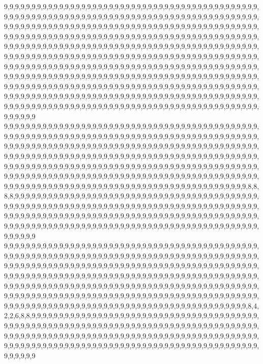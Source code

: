 9,9,9,9,9,9,9,9,9,9,9,9,9,9,9,9,9,9,9,9,9,9,9,9,9,9,9,9,9,9,9,9,9,9,9,9,9,9,9,9,9,9,9,9,9,9,9,9,9,9,9,9,9,9,9,9,9,9,9,9,9,9,9,9,9,9,9,9,9,9,9,9,9,9,9,9,9,9,9,9,9,9,9,9,9,9,9,9,9,9,9,9,9,9,9,9,9,9,9,9,9,9,9,9,9,9,9,9,9,9,9,9,9,9,9,9,9,9,9,9,9,9,9,9,9,9,9,9,9,9,9,9,9,9,9,9,9,9,9,9,9,9,9,9,9,9,9,9,9,9,9,9,9,9,9,9,9,9,9,9,9,9,9,9,9,9,9,9,9,9,9,9,9,9,9,9,9,9,9,9,9,9,9,9,9,9,9,9,9,9,9,9,9,9,9,9,9,9,9,9,9,9,9,9,9,9,9,9,9,9,9,9,9,9,9,9,9,9,9,9,9,9,9,9,9,9,9,9,9,9,9,9,9,9,9,9,9,9,9,9,9,9,9,9,9,9,9,9,9,9,9,9,9,9,9,9,9,9,9,9,9,9,9,9,9,9,9,9,9,9,9,9,9,9,9,9,9,9,9,9,9,9,9,9,9,9,9,9,9,9,9,9,9,9,9,9,9,9,9,9,9,9,9,9,9,9,9,9,9,9,9,9,9,9,9,9,9,9,9,9,9,9,9,9,9,9,9,9,9,9,9,9,9,9,9,9,9,9,9,9,9,9,9,9,9,9,9,9,9,9,9,9,9,9,9,9,9,9,9,9,9,9,9,9,9,9,9,9,9,9,9,9,9,9,9,9,9,9,9,9,9,9,9,9,9,9,9,9,9,9,9,9,9,9,9,9,9,9,9,9,9,9,9,9,9,9,9,9,9,9,9,9,9,9,9,9,9,9,9,9,9,9,9,9,9,9,9,9,9,9,9,9,9,9,9,9,9,9,9,9,9,9,9,9,9,9,9,9,9,9,9,9,9,9,9,9,9,9,9,9,9,9,9,9,9,9,9,9,9,9,9,9,9,9,9,9,9,9,9,9,9,9,9,9,9,9,9,9,9,9,9,9,9,9,9,9,9,9,9,9,9,9,9,9,9,9,9,9,9,9,9,9
9,9,9,9,9,9,9,9,9,9,9,9,9,9,9,9,9,9,9,9,9,9,9,9,9,9,9,9,9,9,9,9,9,9,9,9,9,9,9,9,9,9,9,9,9,9,9,9,9,9,9,9,9,9,9,9,9,9,9,9,9,9,9,9,9,9,9,9,9,9,9,9,9,9,9,9,9,9,9,9,9,9,9,9,9,9,9,9,9,9,9,9,9,9,9,9,9,9,9,9,9,9,9,9,9,9,9,9,9,9,9,9,9,9,9,9,9,9,9,9,9,9,9,9,9,9,9,9,9,9,9,9,9,9,9,9,9,9,9,9,9,9,9,9,9,9,9,9,9,9,9,9,9,9,9,9,9,9,9,9,9,9,9,9,9,9,9,9,9,9,9,9,9,9,9,9,9,9,9,9,9,9,9,9,9,9,9,9,9,9,9,9,9,9,9,9,9,9,9,9,9,9,9,9,9,9,9,9,9,9,9,9,9,9,9,9,9,9,9,9,9,9,9,9,9,9,9,9,9,9,9,9,9,9,9,9,9,9,9,9,9,9,9,9,9,9,9,9,9,9,9,9,9,9,9,9,9,9,9,9,9,9,9,9,9,9,9,9,9,9,9,9,9,9,9,9,9,9,9,9,9,9,9,9,9,9,9,9,9,9,9,9,9,9,9,9,9,9,9,9,9,9,9,9,9,9,9,9,9,9,9,9,9,9,9,9,9,9,9,9,8,8,8,8,9,9,9,9,9,9,9,9,9,9,9,9,9,9,9,9,9,9,9,9,9,9,9,9,9,9,9,9,9,9,9,9,9,9,9,9,9,9,9,9,9,9,9,9,9,9,9,9,9,9,9,9,9,9,9,9,9,9,9,9,9,9,9,9,9,9,9,9,9,9,9,9,9,9,9,9,9,9,9,9,9,9,9,9,9,9,9,9,9,9,9,9,9,9,9,9,9,9,9,9,9,9,9,9,9,9,9,9,9,9,9,9,9,9,9,9,9,9,9,9,9,9,9,9,9,9,9,9,9,9,9,9,9,9,9,9,9,9,9,9,9,9,9,9,9,9,9,9,9,9,9,9,9,9,9,9,9,9,9,9,9,9,9,9,9,9,9,9,9,9,9,9,9,9,9,9,9,9,9,9,9,9,9,9,9,9,9,9
9,9,9,9,9,9,9,9,9,9,9,9,9,9,9,9,9,9,9,9,9,9,9,9,9,9,9,9,9,9,9,9,9,9,9,9,9,9,9,9,9,9,9,9,9,9,9,9,9,9,9,9,9,9,9,9,9,9,9,9,9,9,9,9,9,9,9,9,9,9,9,9,9,9,9,9,9,9,9,9,9,9,9,9,9,9,9,9,9,9,9,9,9,9,9,9,9,9,9,9,9,9,9,9,9,9,9,9,9,9,9,9,9,9,9,9,9,9,9,9,9,9,9,9,9,9,9,9,9,9,9,9,9,9,9,9,9,9,9,9,9,9,9,9,9,9,9,9,9,9,9,9,9,9,9,9,9,9,9,9,9,9,9,9,9,9,9,9,9,9,9,9,9,9,9,9,9,9,9,9,9,9,9,9,9,9,9,9,9,9,9,9,9,9,9,9,9,9,9,9,9,9,9,9,9,9,9,9,9,9,9,9,9,9,9,9,9,9,9,9,9,9,9,9,9,9,9,9,9,9,9,9,9,9,9,9,9,9,9,9,9,9,9,9,9,9,9,9,9,9,9,9,9,9,9,9,9,9,9,9,9,9,9,9,9,9,9,9,9,9,9,9,9,9,9,9,9,9,9,9,9,9,9,9,9,9,9,9,9,9,9,9,9,9,9,9,9,9,9,9,9,9,9,9,9,9,9,9,9,9,9,9,9,9,9,9,9,9,9,9,8,4,2,2,6,8,8,9,9,9,9,9,9,9,9,9,9,9,9,9,9,9,9,9,9,9,9,9,9,9,9,9,9,9,9,9,9,9,9,9,9,9,9,9,9,9,9,9,9,9,9,9,9,9,9,9,9,9,9,9,9,9,9,9,9,9,9,9,9,9,9,9,9,9,9,9,9,9,9,9,9,9,9,9,9,9,9,9,9,9,9,9,9,9,9,9,9,9,9,9,9,9,9,9,9,9,9,9,9,9,9,9,9,9,9,9,9,9,9,9,9,9,9,9,9,9,9,9,9,9,9,9,9,9,9,9,9,9,9,9,9,9,9,9,9,9,9,9,9,9,9,9,9,9,9,9,9,9,9,9,9,9,9,9,9,9,9,9,9,9,9,9,9,9,9,9,9,9,9,9,9,9,9,9,9,9,9,9,9,9,9,9
